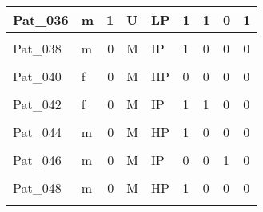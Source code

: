 \documentclass[11pt, a4paper, twosided]{book}
\begin{document}
\begin{longtable}[t]{l|l|r|l|l|l|l|l|l}
\hline
Pat\_036 & m & 1 & U & LP & 1 & 1 & 0 & 1\\
\hline
\cellcolor[HTML]{E2E868}{Pat\_037} & \cellcolor[HTML]{E2E868}{f} & \cellcolor[HTML]{E2E868}{1} & \cellcolor[HTML]{E2E868}{U} & \cellcolor[HTML]{E2E868}{IP} & \cellcolor[HTML]{E2E868}{1} & \cellcolor[HTML]{E2E868}{0} & \cellcolor[HTML]{E2E868}{0} & \cellcolor[HTML]{E2E868}{0}\\
\hline
Pat\_038 & m & 0 & M & IP & 1 & 0 & 0 & 0\\
\hline
\cellcolor[HTML]{E2E868}{Pat\_039} & \cellcolor[HTML]{E2E868}{m} & \cellcolor[HTML]{E2E868}{1} & \cellcolor[HTML]{E2E868}{M} & \cellcolor[HTML]{E2E868}{HP} & \cellcolor[HTML]{E2E868}{1} & \cellcolor[HTML]{E2E868}{0} & \cellcolor[HTML]{E2E868}{0} & \cellcolor[HTML]{E2E868}{0}\\
\hline
Pat\_040 & f & 0 & M & HP & 0 & 0 & 0 & 0\\
\hline
\cellcolor[HTML]{E2E868}{Pat\_041} & \cellcolor[HTML]{E2E868}{f} & \cellcolor[HTML]{E2E868}{1} & \cellcolor[HTML]{E2E868}{U} & \cellcolor[HTML]{E2E868}{LP} & \cellcolor[HTML]{E2E868}{0} & \cellcolor[HTML]{E2E868}{0} & \cellcolor[HTML]{E2E868}{1} & \cellcolor[HTML]{E2E868}{0}\\
\hline
Pat\_042 & f & 0 & M & IP & 1 & 1 & 0 & 0\\
\hline
\cellcolor[HTML]{E2E868}{Pat\_043} & \cellcolor[HTML]{E2E868}{f} & \cellcolor[HTML]{E2E868}{0} & \cellcolor[HTML]{E2E868}{M} & \cellcolor[HTML]{E2E868}{HP} & \cellcolor[HTML]{E2E868}{1} & \cellcolor[HTML]{E2E868}{0} & \cellcolor[HTML]{E2E868}{0} & \cellcolor[HTML]{E2E868}{0}\\
\hline
Pat\_044 & m & 0 & M & HP & 1 & 0 & 0 & 0\\
\hline
\cellcolor[HTML]{E2E868}{Pat\_045} & \cellcolor[HTML]{E2E868}{m} & \cellcolor[HTML]{E2E868}{0} & \cellcolor[HTML]{E2E868}{U} & \cellcolor[HTML]{E2E868}{LP} & \cellcolor[HTML]{E2E868}{0} & \cellcolor[HTML]{E2E868}{0} & \cellcolor[HTML]{E2E868}{0} & \cellcolor[HTML]{E2E868}{0}\\
\hline
Pat\_046 & m & 0 & M & IP & 0 & 0 & 1 & 0\\
\hline
\cellcolor[HTML]{E2E868}{Pat\_047} & \cellcolor[HTML]{E2E868}{m} & \cellcolor[HTML]{E2E868}{0} & \cellcolor[HTML]{E2E868}{M} & \cellcolor[HTML]{E2E868}{HP} & \cellcolor[HTML]{E2E868}{1} & \cellcolor[HTML]{E2E868}{0} & \cellcolor[HTML]{E2E868}{0} & \cellcolor[HTML]{E2E868}{0}\\
\hline
Pat\_048 & m & 0 & M & HP & 1 & 0 & 0 & 0\\
\hline
\cellcolor[HTML]{E2E868}{Pat\_049} & \cellcolor[HTML]{E2E868}{f} & \cellcolor[HTML]{E2E868}{0} & \cellcolor[HTML]{E2E868}{M} & \cellcolor[HTML]{E2E868}{IP} & \cellcolor[HTML]{E2E868}{0} & \cellcolor[HTML]{E2E868}{1} & \cellcolor[HTML]{E2E868}{0} & \cellcolor[HTML]{E2E868}{0}\\

\end{longtable}
\end{document}
